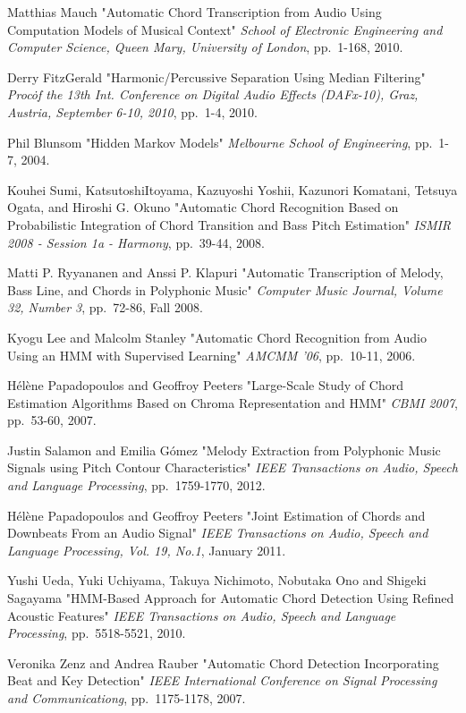 \documentclass{article}
\begin{document}
\begin{thebibliography}{citations}
Matthias Mauch
"Automatic Chord Transcription from Audio Using Computation Models of Musical Context"
{\it School of Electronic Engineering and Computer Science, Queen Mary, University of London},
pp.~1-168, 2010.

Derry FitzGerald
"Harmonic/Percussive Separation Using Median Filtering"
{\it Proc\. of the 13th Int. Conference on Digital Audio Effects (DAFx-10), Graz, Austria, September 6-10, 2010},
pp.~1-4, 2010.

Phil Blunsom
"Hidden Markov Models"
{\it Melbourne School of Engineering},
pp.~1-7, 2004.

Kouhei Sumi, KatsutoshiItoyama, Kazuyoshi Yoshii, Kazunori Komatani, Tetsuya Ogata, and Hiroshi G. Okuno
"Automatic Chord Recognition Based on Probabilistic Integration of Chord Transition and Bass Pitch Estimation"
{\it ISMIR 2008 - Session 1a - Harmony},
pp.~39-44, 2008.

Matti P. Ryyananen and Anssi P. Klapuri
"Automatic Transcription of Melody, Bass Line, and Chords in Polyphonic Music"
{\it Computer Music Journal, Volume 32, Number 3},
pp.~72-86, Fall 2008.

Kyogu Lee and Malcolm Stanley
"Automatic Chord Recognition from Audio Using an HMM with Supervised Learning"
{\it AMCMM '06},
pp.~10-11, 2006.

Hélène Papadopoulos and Geoffroy Peeters
"Large-Scale Study of Chord Estimation Algorithms Based on Chroma Representation and HMM"
{\it CBMI 2007},
pp.~53-60, 2007.

Justin Salamon and Emilia G{\'o}mez
"Melody Extraction from Polyphonic Music Signals using Pitch Contour Characteristics"
{\it IEEE Transactions on Audio, Speech and Language Processing},
pp.~1759-1770, 2012.

Hélène Papadopoulos and Geoffroy Peeters
"Joint Estimation of Chords and Downbeats From an Audio Signal"
{\it IEEE Transactions on Audio, Speech and Language Processing, Vol. 19, No.1},
January 2011.

Yushi Ueda, Yuki Uchiyama, Takuya Nichimoto, Nobutaka Ono and Shigeki Sagayama
"HMM-Based Approach for Automatic Chord Detection Using Refined Acoustic Features"
{\it IEEE Transactions on Audio, Speech and Language Processing},
pp.~5518-5521, 2010.

Veronika Zenz and Andrea Rauber
"Automatic Chord Detection Incorporating Beat and Key Detection"
{\it IEEE International Conference on Signal Processing and Communicationg},
pp.~1175-1178, 2007.


\end{thebibliography}
\end{document}
